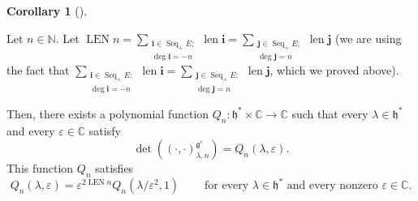 \documentclass
[numbers=enddot,12pt,final,onecolumn,german,notitlepage]{scrartcl}%
\theoremstyle{definition}
\newtheorem{coro}[theo]{Corollary}
\newenvironment{corollary}[1][]
{\begin{coro}[#1]\begin{leftbar}}
{\end{leftbar}\end{coro}}
\begin{document}
\begin{corollary}
\label{cor.invformnondeg.polynomiality}Let $n\in\mathbb{N}$. Let
$\operatorname*{LEN}n=\sum\limits_{\substack{\mathbf{i}\in\operatorname*{Seq}%
\nolimits_{+}E;\\\deg\mathbf{i}=-n}}\operatorname*{len}\mathbf{i=}%
\sum\limits_{\substack{\mathbf{j}\in\operatorname*{Seq}\nolimits_{+}%
E;\\\deg\mathbf{j}=n}}\operatorname*{len}\mathbf{j}$ (we are using the fact
that $\sum\limits_{\substack{\mathbf{i}\in\operatorname*{Seq}\nolimits_{+}%
E;\\\deg\mathbf{i}=-n}}\operatorname*{len}\mathbf{i=}\sum
\limits_{\substack{\mathbf{j}\in\operatorname*{Seq}\nolimits_{+}%
E;\\\deg\mathbf{j}=n}}\operatorname*{len}\mathbf{j}$, which we proved above).

Then, there exists a polynomial function $Q_{n}:\mathfrak{h}^{\ast}%
\times\mathbb{C}\rightarrow\mathbb{C}$ such that every $\lambda\in
\mathfrak{h}^{\ast}$ and every $\varepsilon\in\mathbb{C}$ satisfy%
\[
\det\left(  \left(  \cdot,\cdot\right)  _{\lambda,n}^{\mathfrak{g}%
^{\varepsilon}}\right)  =Q_{n}\left(  \lambda,\varepsilon\right)  .
\]
This function $Q_{n}$ satisfies%
\[
Q_{n}\left(  \lambda,\varepsilon\right)  =\varepsilon^{2\operatorname*{LEN}%
n}Q_{n}\left(  \lambda/\varepsilon^{2},1\right)  \ \ \ \ \ \ \ \ \ \ \text{for
every }\lambda\in\mathfrak{h}^{\ast}\text{ and every nonzero }\varepsilon
\in\mathbb{C}.
\]

\end{corollary}
\end{document}

